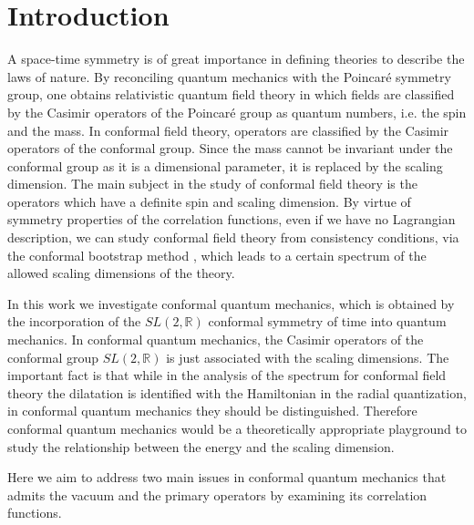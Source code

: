 \documentclass[12pt]{article}
\numberwithin{equation}{section}
\begin{document}
\section{Introduction}
A space-time symmetry is of great importance 
in defining theories to describe the laws of nature. 
By reconciling quantum mechanics with the Poincar\'{e} symmetry group, 
one obtains relativistic quantum field theory in which 
fields are classified by the Casimir operators of the Poincar\'{e} group 
as quantum numbers, i.e. the spin and the mass.   
In conformal field theory, 
operators are classified 
by the Casimir operators of the conformal group. 
Since the mass cannot be invariant under the conformal group 
as it is a dimensional parameter, it is replaced by the scaling dimension. 
The main subject in the study of conformal field theory 
is the operators which have a definite spin and scaling dimension. 
%
By virtue of symmetry properties of the correlation functions, 
even if we have no Lagrangian description, 
we can study conformal field theory 
from consistency conditions, via the conformal bootstrap method 
\cite{Ferrara:1973yt,Polyakov:1974gs,Mack:1975jr}, 
which leads to a certain spectrum of the allowed scaling dimensions 
of the theory. 

In this work we investigate conformal quantum mechanics,   
which is obtained 
by the incorporation of the $SL(2,\mathbb{R})$ 
conformal symmetry of time into quantum mechanics. 
In conformal quantum mechanics, 
the Casimir operators of the conformal group $SL(2,\mathbb{R})$ 
is just associated with the scaling dimensions. 
The important fact is that 
while in the analysis of the spectrum for conformal field theory 
the dilatation is identified with the Hamiltonian in the radial quantization, 
in conformal quantum mechanics they should be distinguished. 
Therefore conformal quantum mechanics would be a theoretically appropriate playground to study 
the relationship between the energy and the scaling dimension. 

Here we aim to address two main issues in conformal quantum mechanics 
that admits the vacuum and the primary operators by examining its correlation functions. 
\end{document}
